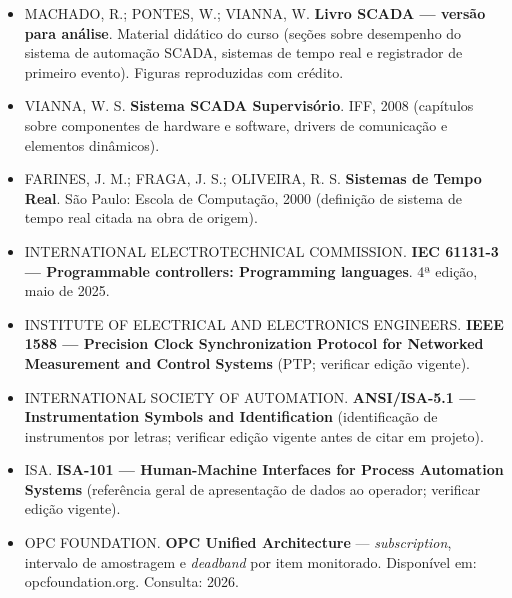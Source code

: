 \begin{itemize}
\tightlist
\item
  MACHADO, R.; PONTES, W.; VIANNA, W. \textbf{Livro SCADA --- versão para análise}. Material didático do curso (seções sobre desempenho do sistema de automação SCADA, sistemas de tempo real e registrador de primeiro evento). Figuras reproduzidas com crédito.
\item
  VIANNA, W. S. \textbf{Sistema SCADA Supervisório}. IFF, 2008 (capítulos sobre componentes de hardware e software, drivers de comunicação e elementos dinâmicos).
\item
  FARINES, J. M.; FRAGA, J. S.; OLIVEIRA, R. S. \textbf{Sistemas de Tempo Real}. São Paulo: Escola de Computação, 2000 (definição de sistema de tempo real citada na obra de origem).
\item
  INTERNATIONAL ELECTROTECHNICAL COMMISSION. \textbf{IEC 61131-3 --- Programmable controllers: Programming languages}. 4ª edição, maio de 2025.
\item
  INSTITUTE OF ELECTRICAL AND ELECTRONICS ENGINEERS. \textbf{IEEE 1588 --- Precision Clock Synchronization Protocol for Networked Measurement and Control Systems} (PTP; verificar edição vigente).
\item
  INTERNATIONAL SOCIETY OF AUTOMATION. \textbf{ANSI/ISA-5.1 --- Instrumentation Symbols and Identification} (identificação de instrumentos por letras; verificar edição vigente antes de citar em projeto).
\item
  ISA. \textbf{ISA-101 --- Human-Machine Interfaces for Process Automation Systems} (referência geral de apresentação de dados ao operador; verificar edição vigente).
\item
  OPC FOUNDATION. \textbf{OPC Unified Architecture} --- \emph{subscription}, intervalo de amostragem e \emph{deadband} por item monitorado. Disponível em: opcfoundation.org. Consulta: 2026.
\end{itemize}
